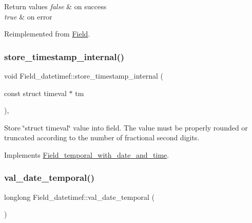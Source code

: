 \begin{DoxyRetVals}{Return values}
{\em false} & on success \\
\hline
{\em true} & on error \\
\hline
\end{DoxyRetVals}


Reimplemented from \mbox{\hyperlink{classField_a5c09752e8441d64ce2e4e611508bab7a}{Field}}.

\mbox{\label{classField__datetimef_adb90beeaafa4b792067cd838084e230f}} 
\subsubsection{\texorpdfstring{store\+\_\+timestamp\+\_\+internal()}{store\_timestamp\_internal()}}
{\footnotesize\ttfamily void Field\+\_\+datetimef\+::store\+\_\+timestamp\+\_\+internal (\begin{DoxyParamCaption}\item[{const struct timeval $\ast$}]{tm }\end{DoxyParamCaption})\hspace{0.3cm}{\ttfamily [protected]}, {\ttfamily [virtual]}}

Store \char`\"{}struct timeval\char`\"{} value into field. The value must be properly rounded or truncated according to the number of fractional second digits. 

Implements \mbox{\hyperlink{classField__temporal__with__date__and__time_a3cfd6dc59b102362d592341dbf40a19e}{Field\+\_\+temporal\+\_\+with\+\_\+date\+\_\+and\+\_\+time}}.

\mbox{\label{classField__datetimef_aec7455bda53c84017097539ac92c91d2}} 
\subsubsection{\texorpdfstring{val\+\_\+date\+\_\+temporal()}{val\_date\_temporal()}}
{\footnotesize\ttfamily longlong Field\+\_\+datetimef\+::val\+\_\+date\+\_\+temporal (\begin{DoxyParamCaption}{ }\end{DoxyParamCaption})\hspace{0.3cm}{\ttfamily [virtual]}}

